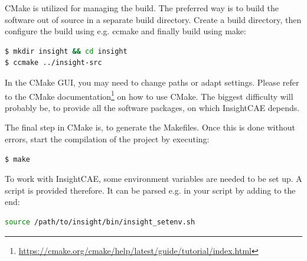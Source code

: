 CMake is utilized for managing the build. 
The preferred way is to build the software out of source in a separate build directory. Create a build directory, then configure the build using e.g. ccmake and finally build using make:

\begin{lstlisting}[language=bash]
$ mkdir insight && cd insight
$ ccmake ../insight-src
\end{lstlisting}
In the CMake GUI, you may need to change paths or adapt settings. Please refer to the CMake documentation\footnote{\url{https://cmake.org/cmake/help/latest/guide/tutorial/index.html}} on how to use CMake.
The biggest difficulty will probably be, to provide all the software packages, on which InsightCAE depends.

The final step in CMake is, to generate the Makefiles. Once this is done without errors, start the compilation of the project by executing:

\begin{lstlisting}[language=bash]
$ make
\end{lstlisting}

To work with InsightCAE, some environment variables are needed to be set up. A script is provided therefore. It can be parsed e.g. in your  script by adding to the end:

\begin{lstlisting}[language=bash]
source /path/to/insight/bin/insight_setenv.sh
\end{lstlisting}

